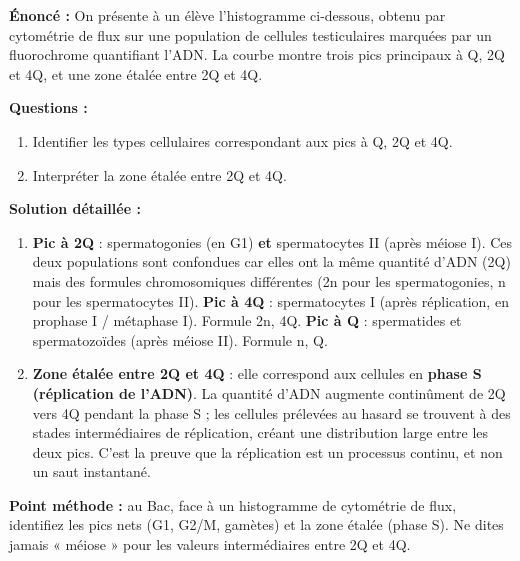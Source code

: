 \documentclass[11pt]{article}
\begin{document}
\begin{exoresolu}
\textbf{Énoncé :} On présente à un élève l'histogramme ci-dessous, obtenu par cytométrie de flux sur une population de cellules testiculaires marquées par un fluorochrome quantifiant l'ADN. La courbe montre trois pics principaux à Q, 2Q et 4Q, et une zone étalée entre 2Q et 4Q.
\begin{center}
\end{center}
\textbf{Questions :}
\begin{enumerate}
    \item Identifier les types cellulaires correspondant aux pics à Q, 2Q et 4Q.
    \item Interpréter la zone étalée entre 2Q et 4Q.
\end{enumerate}
\tcblower
\textbf{Solution détaillée :}
\begin{enumerate}
    \item \textbf{Pic à 2Q} : spermatogonies (en G1) \textbf{et} spermatocytes II (après méiose I). Ces deux populations sont confondues car elles ont la même quantité d'ADN (2Q) mais des formules chromosomiques différentes (2n pour les spermatogonies, n pour les spermatocytes II).
    \textbf{Pic à 4Q} : spermatocytes I (après réplication, en prophase I / métaphase I). Formule 2n, 4Q.
    \textbf{Pic à Q} : spermatides et spermatozoïdes (après méiose II). Formule n, Q.
    \item \textbf{Zone étalée entre 2Q et 4Q} : elle correspond aux cellules en \textbf{phase S (réplication de l'ADN)}. La quantité d'ADN augmente continûment de 2Q vers 4Q pendant la phase S ; les cellules prélevées au hasard se trouvent à des stades intermédiaires de réplication, créant une distribution large entre les deux pics. C'est la preuve que la réplication est un processus continu, et non un saut instantané.
\end{enumerate}
\textbf{Point méthode :} au Bac, face à un histogramme de cytométrie de flux, identifiez les pics nets (G1, G2/M, gamètes) et la zone étalée (phase S). Ne dites jamais « méiose » pour les valeurs intermédiaires entre 2Q et 4Q.
\end{exoresolu}
\end{document}
